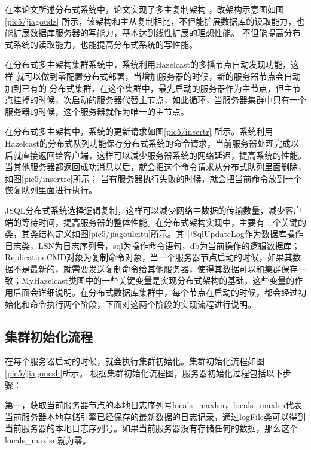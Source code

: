 在本论文所述分布式系统中，论文实现了多主复制架构
，改架构示意图如图\ref{pic5/jiagoudz}
所示，该架构和主从复制相比，不但能扩展数据库的读取能力，也能扩展数据库服务器的写能力，基本达到线性扩展的理想性能。
不但能提高分布式系统的读取能力，也能提高分布式系统的写性能。

在分布式多主架构集群系统中，系统利用Hazelcast的多播节点自动发现功能，这样
就可以做到零配置分布式部署，当增加服务器的时候，新的服务器节点会自动加到已有的
分布式集群，在这个集群中，最先启动的服务器作为主节点，但主节点挂掉的时候，次启动的服务器代替主节点，如此循环，当服务器集群中只有一个服务器的时候，这个服务器就作为唯一的主节点。

在分布式多主架构中，系统的更新请求如图\ref{pic5/insertr}
所示。系统利用Hazelcast的分布式队列功能保存分布式系统的命令请求，当前服务器处理完成以后就直接返回给客户端，这样可以减少服务器系统的网络延迟，提高系统的性能。当其他服务器都返回成功消息以后，就会把这个命令请求从分布式队列里面删除，如图\ref{pic5/insertre}所示；
当有服务器执行失败的时候，就会把当前命令放到一个恢复队列里面进行执行。

JSQL分布式系统选择逻辑复制，这样可以减少网络中数据的传输数量，减少客户端的等待时间，提高服务器的整体性能。在分布式架构实现中，主要有三个关键的类，其类结构定义如图\ref{pic5/jiagouleitu}所示。其中SqlUpdateLog作为数据库操作日志类，LSN为日志序列号，sql为操作命令语句，db为当前操作的逻辑数据库；ReplicationCMD对象为复制命令对象，当一个服务器节点启动的时候，如果其数据不是最新的，就需要发送复制命令给其他服务器，使得其数据可以和集群保存一致；MyHazelcast类图中的一些关键变量是实现分布式架构的基础，这些变量的作用后面会详细说明。在分布式数据库集群中，每个节点在启动的时候，都会经过初始化和命令执行两个阶段，下面对这两个阶段的实现流程进行说明。
\subsection{集群初始化流程}
在每个服务器启动的时候，就会执行集群初始化。集群初始化流程如图
\ref{pic5/jiagoucsh}所示。
根据集群初始化流程图，服务器初始化过程包括以下步骤：

第一，获取当前服务器节点的本地日志序列号locals\_maxlsn，locals\_maxlsn代表当前服务器本地存储引擎已经保存的最新数据的日志记录，通过logFile类可以得到当前服务器的本地日志序列号。如果当前服务器没有存储任何的数据，那么这个locals\_maxlsn就为零。

